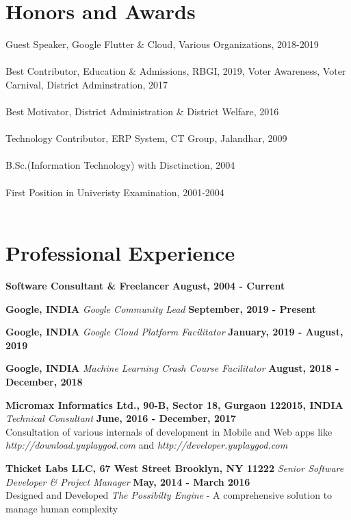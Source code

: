 \documentclass[margin,line]{res}
\begin{document}
\begin{resume}
\section{\sc Honors and Awards}
Guest Speaker, Google Flutter \& Cloud, Various Organizations, 2018-2019\\\\
Best Contributor, Education \& Admissions, RBGI, 2019,
Voter Awareness, Voter Carnival, District Adminstration, 2017\\\\
Best Motivator, District Administration \& District Welfare, 2016\\\\
Technology Contributor, ERP System, CT Group, Jalandhar, 2009\\\\
B.Sc.(Information Technology) with Disctinction, 2004\\\\
First Position in Univeristy Examination, 2001-2004\\\\

\section{\sc Professional Experience}

{\bf Software Consultant \& Freelancer} \hfill {\bf August, 2004 - Current}

{\bf Google, INDIA}
{\em Google Community Lead} \hfill {\bf September, 2019 - Present}

{\bf Google, INDIA}
{\em Google Cloud Platform Facilitator} \hfill {\bf January, 2019 - August, 2019}

{\bf Google, INDIA}
{\em Machine Learning Crash Course Facilitator} \hfill {\bf August, 2018 - December, 2018}

{\bf Micromax Informatics Ltd., 90-B, Sector 18, Gurgaon 122015, INDIA}
{\em Technical Consultant} \hfill {\bf June, 2016 - December, 2017}\\
Consultation of various internals of development in Mobile and Web apps like {\em http://download.yuplaygod.com} and {\em http://developer.yuplaygod.com}

{\bf Thicket Labs LLC, 67 West Street Brooklyn, NY 11222}
{\em Senior Software Developer \& Project Manager} \hfill {\bf May, 2014 - March 2016}\\
Designed and Developed {\em The Possibilty Engine} - A comprehensive solution to manage human complexity


\end{resume}
\end{document}
